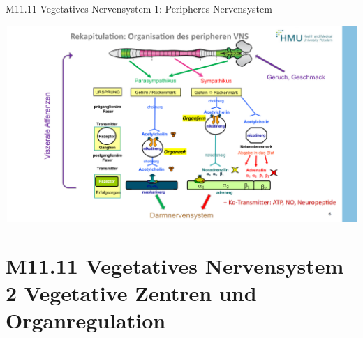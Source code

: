 \documentclass{beamer}
\begin{document}
\begin{frame}{M11.11 Vegetatives Nervensystem 1: Peripheres Nervensystem}

\begin{center}
    \includegraphics[width=\textwidth]{peripheres_VNS.png}
\end{center}

    
\end{frame}








\section{M11.11 Vegetatives Nervensystem 2 Vegetative Zentren und Organregulation}





 

\end{document}
